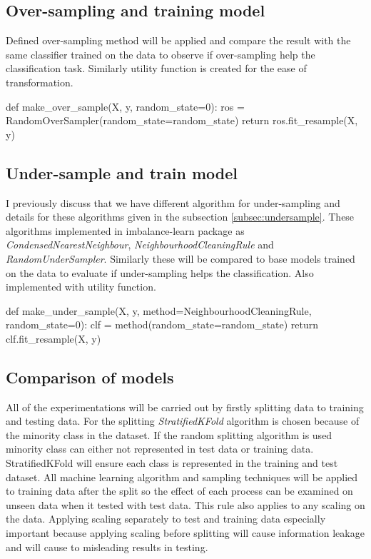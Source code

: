 \documentclass[12pt]{article}
\begin{document}
\subsection{Over-sampling and training model} \label{subsec:oversample}
Defined over-sampling method will be applied and compare the result with the same classifier trained on the data to observe if over-sampling help the classification task. Similarly utility function is created for the ease of transformation.

\begin{python}
    def make_over_sample(X, y, random_state=0):
        ros = RandomOverSampler(random_state=random_state)
        return ros.fit_resample(X, y)
\end{python}

\subsection{Under-sample and train model} \label{subsec:compareundersample}

I previously discuss that we have different algorithm for under-sampling and details for these algorithms given in the subsection \ref{subsec:undersample}. These algorithms implemented in imbalance-learn package as \textit{CondensedNearestNeighbour}, \textit{NeighbourhoodCleaningRule} and \textit{RandomUnderSampler}. Similarly these will be compared to base models trained on the data to evaluate if under-sampling helps the classification. Also implemented with utility function.

\begin{python}
    def make_under_sample(X, y, method=NeighbourhoodCleaningRule, random_state=0):
        clf = method(random_state=random_state)
        return clf.fit_resample(X, y)
\end{python}

\subsection{Comparison of models} \label{subsec:comparison}

All of the experimentations will be carried out by firstly splitting data to training and testing data. For the splitting \textit{StratifiedKFold} algorithm is chosen because of the minority class in the dataset. If the random splitting algorithm is used minority class can either not represented in test data or training data. StratifiedKFold will ensure each class is represented in the training and test dataset. All machine learning algorithm and sampling techniques will be applied to training data after the split so the effect of each process can be examined on unseen data when it tested with test data. This rule also applies to any scaling on the data. Applying scaling separately to test and training data especially important because applying scaling before splitting will cause information leakage and will cause to misleading results in testing.
\end{document}

